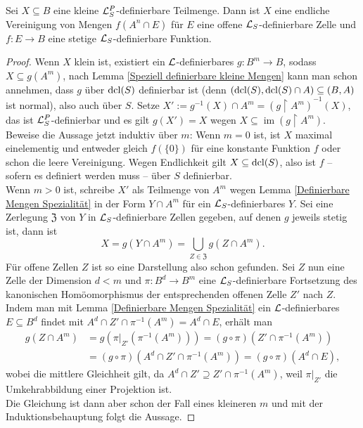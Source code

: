 \begin{lemma}
	Sei $X\subseteq B$ eine kleine $\mathcal{L}^P_S$-definierbare Teilmenge. Dann ist $X$ eine endliche Vereinigung von Mengen $f(A^n\cap E)$ für $E$ eine offene $\mathcal{L}_S$-definierbare Zelle und $f:E\rightarrow B$ eine stetige $\mathcal{L}_S$-definierbare Funktion.
\end{lemma}
\begin{proof}
	Wenn $X$ klein ist, existiert ein $\mathcal{L}$-definierbares $g:B^m\rightarrow B$, sodass $X\subseteq g(A^m)$, nach Lemma \ref{Speziell definierbare kleine Mengen} kann man schon annehmen, dass $g$ über $\operatorname{dcl}(S)$ definierbar ist (denn $(\operatorname{dcl}(S),\operatorname{dcl}(S)\cap A)\subseteq (B,A)$ ist normal), also auch über $S$. Setze $X':=g^{-1}(X)\cap A^m=(g\upharpoonright A^m)^{-1}(X)$, das ist $\mathcal{L}^P_S$-definierbar und es gilt $g(X')=X$ wegen $X\subseteq\operatorname{im}(g\upharpoonright A^m)$.\\
	Beweise die Aussage jetzt induktiv über $m$: Wenn $m=0$ ist, ist $X$ maximal einelementig und entweder gleich $f(\{0\})$ für eine konstante Funktion $f$ oder schon die leere Vereinigung. Wegen Endlichkeit gilt $X\subseteq\operatorname{dcl}(S)$, also ist $f$ \--- sofern es definiert werden muss \--- über $S$ definierbar.\\
	Wenn $m>0$ ist, schreibe $X'$ als Teilmenge von $A^m$ wegen Lemma \ref{Definierbare Mengen Spezialität} in der Form $Y\cap A^m$ für ein $\mathcal{L}_S$-definierbares $Y$. Sei eine Zerlegung $\mathfrak{Z}$ von $Y$ in $\mathcal{L}_S$-definierbare Zellen gegeben, auf denen $g$ jeweils stetig ist, dann ist $$X=g(Y\cap A^m)=\bigcup\limits_{Z\in\mathfrak{Z}}g(Z\cap A^m).$$
	Für offene Zellen $Z$ ist so eine Darstellung also schon gefunden. Sei $Z$ nun eine Zelle der Dimension $d<m$ und $\pi:B^d\rightarrow B^m$ eine $\mathcal{L}_S$-definierbare Fortsetzung des kanonischen Homöomorphismus der entsprechenden offenen Zelle $Z'$ nach $Z$. Indem man mit Lemma \ref{Definierbare Mengen Spezialität} ein $\mathcal{L}$-definierbares $E\subseteq B^d$ findet mit $A^d\cap Z'\cap\pi^{-1}(A^m)=A^d\cap E$, erhält man 
	\begin{align*}
	g(Z\cap A^m)&=g(\pi|_{Z'}(\pi^{-1}(A^m)))=(g\circ\pi)(Z'\cap\pi^{-1}(A^m))\\&=(g\circ\pi)(A^d\cap Z'\cap\pi^{-1}(A^m))=(g\circ\pi)(A^d\cap E),
	\end{align*}
	wobei die mittlere Gleichheit gilt, da $A^d\cap Z'\supseteq Z'\cap\pi^{-1}(A^m)$, weil $\pi|_{Z'}$ die Umkehrabbildung einer Projektion ist.\\
	Die Gleichung ist dann aber schon der Fall eines kleineren $m$ und mit der Induktionsbehauptung folgt die Aussage.
\end{proof}

